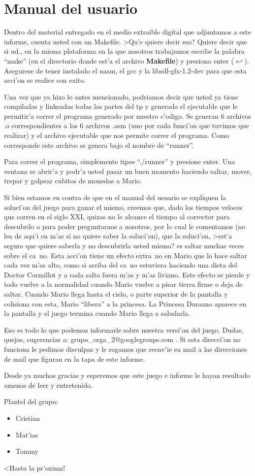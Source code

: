 \section{Manual del usuario}

	Dentro del material entregado en el medio extraible digital que adjuntamos a este informe, 
cuenta usted con un Makefile. >Qu'e quiere decir eso? Quiere decir que si ud., en la misma plataforma
en la que nosotros trabajamos escribe la palabra ``make'' (en el directorio donde est'a el archivo 
\textbf{Makefile}) y presiona enter ($\hookleftarrow$). Asegurese de tener instalado el nasm, el gcc y la libsdl-gfx-1.2-dev para que esta acci'on se realice con exito.

	Una vez que ya hizo lo antes mencionado, podriamos decir que usted ya tiene compiladas y linkeadas
todas las partes del tp y generado el ejecutable que le permitir'a correr el programa generado por nuestro 
c'odigo. Se generan 6 archivos .o correspondientes a los 6 archivos .asm (uno por cada funci'on que tuvimos 
que realizar) y el archivo ejecutable que nos permite correr el programa. Como corresponde este archivo se 
genera bajo el nombre de ``runner''.

	Para correr el programa, simplemente tipee ``./runner'' y presione enter. Una ventana se abrir'a y 
podr'a usted pasar un buen momento haciendo saltar, mover, trepar y golpear cubitos de monedas a Mario.

	Si bien estamos en contra de que en el manual del usuario se expliquen la soluci'on del juego para 
ganar el mismo, creemos que, dado los tiempos veloces que corren en el siglo XXI, quizas no le alcance el tiempo
al corrector para descubrilo o para poder preguntarnos a nosotros, por lo cual le comentamos (no lea de aqu'i 
en m'as si no quiere saber la soluci'on), que la soluci'on, >est'a seguro que quiere saberla y no descubrirla 
usted mismo? es saltar muchas veces sobre el ca~no. Esta acci'on tiene un efecto extra~no en Mario que lo hace
saltar cada vez m'as alto, como si arriba del ca~no estuviera haciendo una dieta del Doctor Cormillot y a cada 
salto fuera m'as y m'as liviano. Este efecto se pierde y todo vuelve a la normalidad cuando Mario vuelve a 
pisar tierra firme o deja de saltar. Cuando Mario llega hasta el cielo, o parte superior de la pantalla y 
colisiona con esta, Mario ``libera'' a la princesa. La Princesa Durazno aparece en la pantalla y el juego termina
cuando Mario llega a saludarla.

	Eso es todo lo que podemos informarle sobre nuestra versi'on del juego. Dudas, quejas, sugerencias a: 
grupo\_orga\_2@googlegroups.com . Si esta direcci'on no funciona le pedimos disculpas y le rogamos que reenv'ie 
su mail a las direcciones de mail que figuran en la tapa de este informe. 

	Desde ya muchas gracias y esperemos que este juego e informe le hayan resultado amenos de leer y 
entretenido.

	Plantel del grupo:
\begin{itemize}
 \item Cristian
 \item Mat'ias
 \item Tommy
\end{itemize}

	<Hasta la pr'oxima!
